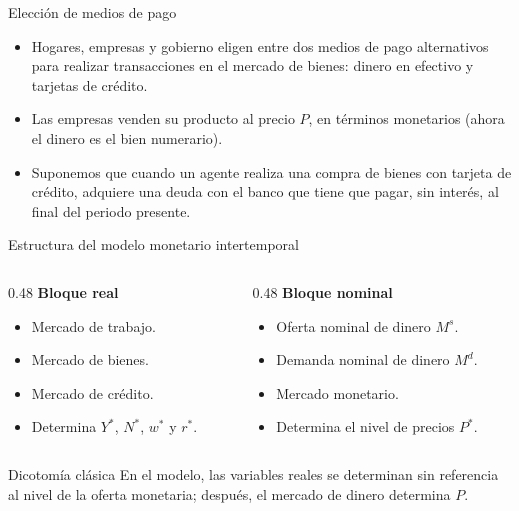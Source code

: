\documentclass[aspectratio=169,11pt]{beamer}
\begin{document}
\begin{frame}{Elección de medios de pago}
  \begin{itemize}
    \item Hogares, empresas y gobierno eligen entre dos medios de pago alternativos para realizar transacciones en el mercado de bienes: dinero en efectivo y tarjetas de crédito.
    \item Las empresas venden su producto al precio $P$, en términos monetarios (ahora el dinero es el bien numerario).
    \item Suponemos que cuando un agente realiza una compra de bienes con tarjeta de crédito, adquiere una deuda con el banco que tiene que pagar, sin interés, al final del periodo presente.
  \end{itemize}
\end{frame}


\begin{frame}{Estructura del modelo monetario intertemporal}
  \begin{columns}[T,onlytextwidth]
    \begin{column}{0.48\textwidth}
      \textbf{Bloque real}
      \begin{itemize}
        \item Mercado de trabajo.
        \item Mercado de bienes.
        \item Mercado de crédito.
        \item Determina $Y^*$, $N^*$, $w^*$ y $r^*$.
      \end{itemize}
    \end{column}
    \begin{column}{0.48\textwidth}
      \textbf{Bloque nominal}
      \begin{itemize}
        \item Oferta nominal de dinero $M^s$.
        \item Demanda nominal de dinero $M^d$.
        \item Mercado monetario.
        \item Determina el nivel de precios $P^*$.
      \end{itemize}
    \end{column}
  \end{columns}
  \vspace{0.25cm}
  \begin{block}{Dicotomía clásica}
    En el modelo, las variables reales se determinan sin referencia al nivel de la oferta monetaria; después, el mercado de dinero determina $P$.
  \end{block}
\end{frame}
\end{document}
